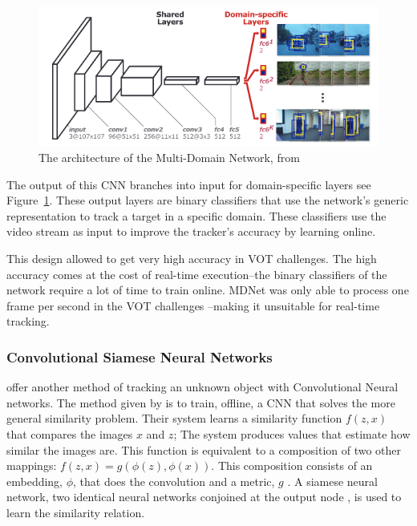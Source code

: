   \begin{figure}[!ht]
    \centering
    \includegraphics[scale=0.5]{MDNet.png}
    \caption{The architecture of the Multi-Domain Network, from \protect\cite{CNNTracking}}
    \label{fig:mdnet}
  \end{figure}
  The output of this CNN branches into input for domain-specific layers see Figure~\ref{fig:mdnet}.
  These output layers are binary classifiers that use the network's generic representation to track a target in a specific domain.
  These classifiers use the video stream as input to improve the tracker's accuracy by learning online.

  This design allowed \citeauthor{CNNTracking} to get very high accuracy in VOT challenges.
  The high accuracy comes at the cost of real-time execution--the binary classifiers of the network require a lot of time to train online.
  MDNet was only able to process one frame per second in the VOT challenges \cite{bertinetto2016}--making it unsuitable for real-time tracking.
  

  \subsubsection{Convolutional Siamese Neural Networks}
  \citet{bertinetto2016} offer another method of tracking an unknown object with Convolutional Neural networks.
  The method given by \citeauthor{bertinetto2016} is to train, offline, a CNN that solves the more general similarity problem.
  Their system learns a similarity function $f(z,x)$ that compares the images $x$ and $z$; The system produces values that estimate how similar the images are.
  This function is equivalent to a composition of two other mappings: $f(z, x) = g(\phi(z), \phi(x))$.
  This composition consists of an embedding, $\phi$,  that does the convolution and a metric, $g$ .
  A siamese neural network, two identical neural networks conjoined at the output node \cite{bromley1993}, is used to learn the similarity relation.

